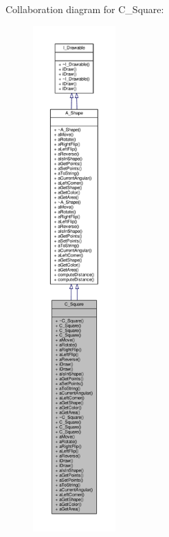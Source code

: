 Collaboration diagram for C\+\_\+\+Square\+:\nopagebreak
\begin{figure}[H]
\begin{center}
\leavevmode
\includegraphics[height=550pt]{classC__Square__coll__graph}
\end{center}
\end{figure}
